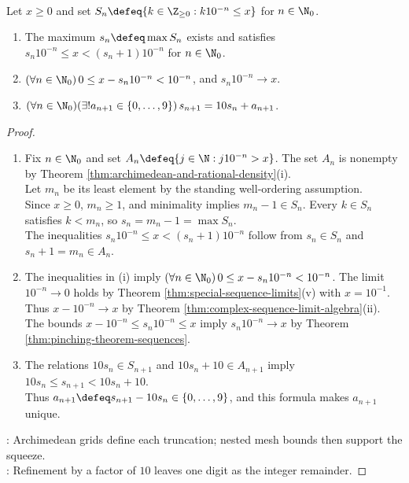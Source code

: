 \begin{proposition} \label{prop:decimal-truncations-squeeze-real} \\
Let $x\geq0$ and set $S_n\defeq\{k\in\Z_{\geq0}:k10^{-n}\leq x\}$ for $n\in\N_0$.
\begin{enumerate}[label=(\roman*)]
\setlength{\itemsep}{0pt}
\item The maximum $s_n\defeq\max S_n$ exists and satisfies $s_n10^{-n}\leq x<(s_n+1)10^{-n}$ for $n\in\N_0$.
\item $(\forall n\in\N_0)\,0\leq x-s_n10^{-n}<10^{-n}$, and $s_n10^{-n}\to x$.
\item $(\forall n\in\N_0)(\exists!a_{n+1}\in\{0,\ldots,9\})\,s_{n+1}=10s_n+a_{n+1}$.
\end{enumerate}
\begin{proof}
\begin{enumerate}[label=(\roman*)]
\setlength{\itemsep}{0pt}
\item Fix $n\in\N_0$ and set $A_n\defeq\{j\in\N:j10^{-n}>x\}$. The set $A_n$ is nonempty by Theorem \ref{thm:archimedean-and-rational-density}(i).\\
Let $m_n$ be its least element by the standing well-ordering assumption.\\
Since $x\geq0$, $m_n\geq1$, and minimality implies $m_n-1\in S_n$. Every $k\in S_n$ satisfies $k<m_n$, so $s_n=m_n-1=\max S_n$.\\
The inequalities $s_n10^{-n}\leq x<(s_n+1)10^{-n}$ follow from $s_n\in S_n$ and $s_n+1=m_n\in A_n$.
\item The inequalities in (i) imply $(\forall n\in\N_0)\,0\leq x-s_n10^{-n}<10^{-n}$. The limit $10^{-n}\to0$ holds by Theorem \ref{thm:special-sequence-limits}(v) with $x=10^{-1}$.\\
Thus $x-10^{-n}\to x$ by Theorem \ref{thm:complex-sequence-limit-algebra}(ii). The bounds $x-10^{-n}\leq s_n10^{-n}\leq x$ imply $s_n10^{-n}\to x$ by Theorem \ref{thm:pinching-theorem-sequences}.
\item The relations $10s_n\in S_{n+1}$ and $10s_n+10\in A_{n+1}$ imply $10s_n\leq s_{n+1}<10s_n+10$.\\
Thus $a_{n+1}\defeq s_{n+1}-10s_n\in\{0,\ldots,9\}$, and this formula makes $a_{n+1}$ unique.
\end{enumerate}
: Archimedean grids define each truncation; nested mesh bounds then support the squeeze.\\
: Refinement by a factor of $10$ leaves one digit as the integer remainder.
\end{proof}
\end{proposition}

